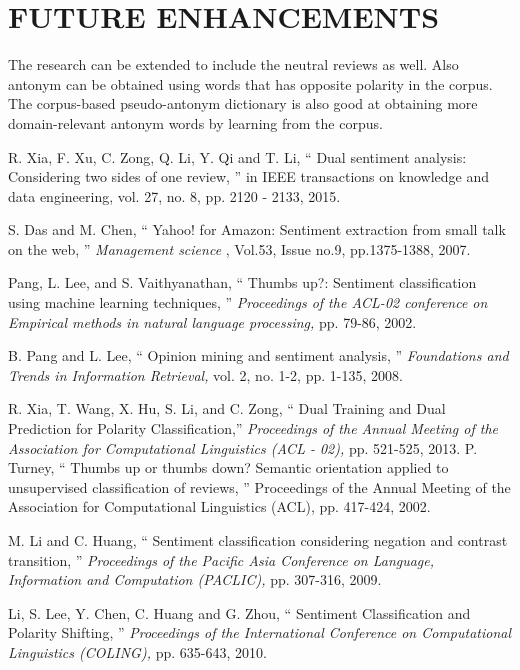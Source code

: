 \documentclass[oneside,a4paper,12pt]{pictreport}
\begin{document}
\chapter{FUTURE ENHANCEMENTS} 
The research can be extended to include the neutral reviews as well.
Also antonym can be obtained using words that has opposite polarity in the corpus.
The corpus-based pseudo-antonym dictionary is also good at obtaining
more domain-relevant antonym words by learning from the
corpus.


\begin{thebibliography}{20}



R. Xia, F. Xu, C. Zong, Q. Li, Y. Qi and T. Li, `` Dual sentiment analysis: Considering  two  sides  of  one 
review, '' in IEEE transactions on knowledge and data engineering, vol. 27, no. 8, pp. 2120
-
2133, 2015.

  S. Das and M. Chen, `` Yahoo! for Amazon: Sentiment extraction from small talk on the web, '' {\em Management science} , Vol.53, Issue no.9, pp.1375-1388, 2007.

  
  
  Pang, L. Lee, and S. Vaithyanathan, `` Thumbs up?: Sentiment classification using machine learning techniques, '' {\em Proceedings of the ACL-02 conference on Empirical methods in natural language processing,}
  pp. 79-86, 2002.
  
  B. Pang and L. Lee, `` Opinion mining and sentiment analysis, '' {\em Foundations
  and Trends in Information Retrieval,} vol. 2, no. 1-2, pp. 1-135, 2008.
  
  R. Xia, T. Wang, X. Hu, S. Li, and C. Zong, `` Dual Training and Dual
Prediction for Polarity Classification,'' {\em Proceedings of the Annual 
Meeting of the Association for Computational Linguistics (ACL - 02),} pp. 521-525,
2013.
  P. Turney, `` Thumbs up or thumbs down? Semantic orientation applied to unsupervised classification of reviews, '' Proceedings of the Annual Meeting of the Association for Computational Linguistics (ACL), pp. 417-424, 2002.

  
  M. Li and C. Huang, `` Sentiment classification considering negation
and contrast transition, '' {\em Proceedings of the Pacific Asia Conference on
Language, Information and Computation (PACLIC),}  pp. 307-316, 2009.


  Li, S. Lee, Y. Chen, C. Huang and G. Zhou, `` Sentiment 
  Classification and Polarity Shifting, '' {\em Proceedings of the International Conference on
  Computational Linguistics (COLING),} pp. 635-643, 2010.
  

\end{thebibliography}
\end{document}
